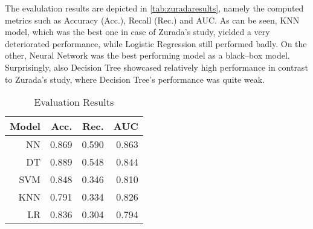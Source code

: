 The evalulation results are depicted in \autoref{tab:zuradaresults}, namely the computed metrics such as Accuracy (Acc.), Recall (Rec.) and AUC.
As can be seen, KNN model, which was the best one in case of Zurada's study, yielded a very deteriorated performance, while Logistic Regression still performed badly.
On the other, Neural Network was the best performing model as a black--box model. Surprisingly, also Decision Tree showcased relatively high performance in contrast to Zurada's study, where Decision Tree's performance was quite weak.
\begin{table}[H]
    \small
    \setlength{\tabcolsep}{8pt}
    \renewcommand{\arraystretch}{1.3}
    \centering
    \caption[Evaluation Results \citep{zurada2014classification}]{Evaluation Results \citep{zurada2014classification}}\label{tab:zuradaresults}
    \begin{tabular}{r r r r}
    \toprule
    \textbf{Model} & \textbf{Acc.} & \textbf{Rec.} & \textbf{AUC}\\
    \midrule
    \hline
    NN & 0.869 & 0.590 & 0.863 \\
    DT & 0.889 & 0.548 & 0.844 \\
    SVM & 0.848 & 0.346 & 0.810 \\
    KNN & 0.791 & 0.334 & 0.826 \\
    LR & 0.836 & 0.304 & 0.794 \\
    \hline
    \bottomrule
    \end{tabular}
    \vspace{0.35em}
    
    \vspace{-1em}
\end{table}

